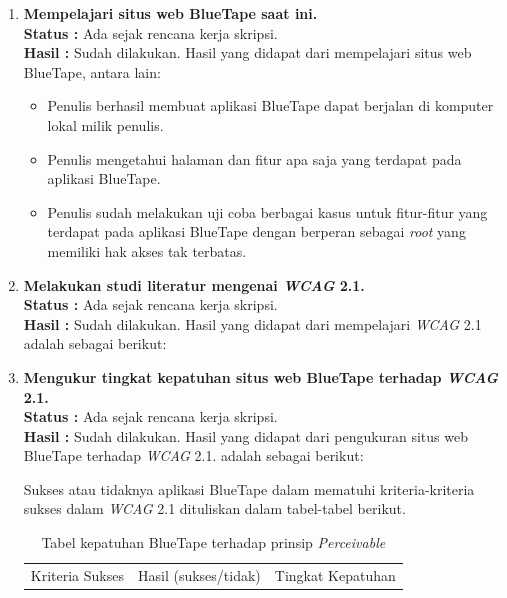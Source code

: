 \documentclass[a4paper,twoside]{article}
\begin{document}
	\begin{enumerate}
		\item \textbf{Mempelajari situs web BlueTape saat ini.}\\
		{\bf Status :} Ada sejak rencana kerja skripsi.\\
		{\bf Hasil :} Sudah dilakukan. Hasil yang didapat dari mempelajari situs web BlueTape, antara lain:
		\begin{itemize}
			\item Penulis berhasil membuat aplikasi BlueTape dapat berjalan di komputer lokal milik penulis. 
			\item Penulis mengetahui halaman dan fitur apa saja yang terdapat pada aplikasi BlueTape.
			\item Penulis sudah melakukan uji coba berbagai kasus untuk fitur-fitur yang terdapat pada aplikasi BlueTape dengan berperan sebagai \textit{root} yang memiliki hak akses tak terbatas. 
		\end{itemize}
		
		\item \textbf{Melakukan studi literatur mengenai \textit{WCAG} 2.1.}\\
		{\bf Status :} Ada sejak rencana kerja skripsi.\\
		{\bf Hasil :} Sudah dilakukan. Hasil yang didapat dari mempelajari \textit{WCAG} 2.1 adalah sebagai berikut:
		
		\item \textbf{Mengukur tingkat kepatuhan situs web BlueTape terhadap \textit{WCAG} 2.1.}\\
		{\bf Status :} Ada sejak rencana kerja skripsi.\\
		{\bf Hasil :} Sudah dilakukan. Hasil yang didapat dari pengukuran situs web BlueTape terhadap \textit{WCAG} 2.1. adalah sebagai berikut:

		Sukses atau tidaknya aplikasi BlueTape dalam mematuhi kriteria-kriteria sukses dalam \textit{WCAG} 2.1 dituliskan dalam tabel-tabel berikut.
		\label{sec:kepatuhan_bluetape_terhadap_wcag_2.1}
		\begin{table}[H]
			\centering 
			\caption{Tabel kepatuhan BlueTape terhadap prinsip \textit{Perceivable}}
			\label{tab:kepatuhan_bluetape_perceivable}
			\begin{tabular}{|c|c|c|}
				\toprule
				Kriteria Sukses & Hasil (sukses/tidak) & Tingkat Kepatuhan \\


\end{tabular}
\end{table}
\end{enumerate}
\end{document}
